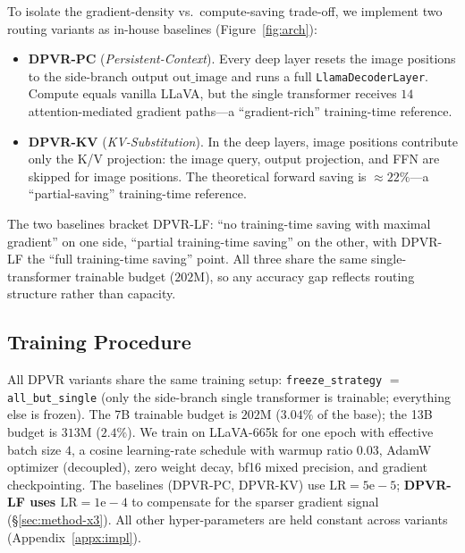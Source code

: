 \documentclass[a4paper,fleqn,review]{cas-sc}
\newcommand{\dpvr}{DPVR}
\newcommand{\dpvrlf}{DPVR-LF}
\newcommand{\dpvrpc}{DPVR-PC}
\newcommand{\dpvrkv}{DPVR-KV}
\begin{document}
To isolate the gradient-density vs.\ compute-saving trade-off, we
implement two routing variants as in-house baselines
(Figure~\ref{fig:arch}):

\begin{itemize}
\item \textbf{\dpvrpc{}} (\emph{Persistent-Context}). Every deep
layer resets the image positions to the side-branch output
$\mathrm{out\_image}$ and runs a full \texttt{LlamaDecoderLayer}.
Compute equals vanilla LLaVA, but the single transformer receives
$14$ attention-mediated gradient paths---a ``gradient-rich''
training-time reference.

\item \textbf{\dpvrkv{}} (\emph{KV-Substitution}). In the deep
layers, image positions contribute only the K/V projection: the
image query, output projection, and FFN are skipped for image
positions. The theoretical forward saving is $\approx 22\%$---a
``partial-saving'' training-time reference.
\end{itemize}

The two baselines bracket \dpvrlf{}: ``no training-time saving with
maximal gradient'' on one side, ``partial training-time saving''
on the other, with \dpvrlf{} the ``full training-time saving'' point.
All three share the same single-transformer trainable budget
($202$M), so any accuracy gap reflects routing structure rather
than capacity.

\subsection{Training Procedure}\label{sec:method-train}

All \dpvr{} variants share the same training setup:
\texttt{freeze\_strategy} $=$ \texttt{all\_but\_single} (only the
side-branch single transformer is trainable; everything else is
frozen). The 7B
trainable budget is $202$M ($3.04\%$ of the base); the 13B
budget is $313$M ($2.4\%$). We train on LLaVA-665k for one
epoch with effective batch size $4$, a cosine learning-rate schedule
with warmup ratio $0.03$, AdamW optimizer (decoupled), zero weight
decay, bf16 mixed precision, and gradient checkpointing. The
baselines (\dpvrpc{}, \dpvrkv{}) use $\mathrm{LR} = 5\mathrm{e}{-}5$;
\textbf{\dpvrlf{} uses $\mathrm{LR} = 1\mathrm{e}{-}4$} to compensate
for the sparser gradient signal (\S\ref{sec:method-x3}). All other
hyper-parameters are held constant across variants
(Appendix~\ref{appx:impl}).

\end{document}
